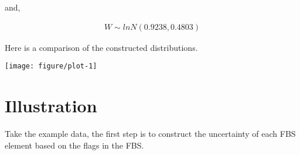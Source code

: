 \documentclass[nojss]{jss}\usepackage[]{graphicx}\usepackage[]{color}
\makeatletter
\def\maxwidth{ %
  \ifdim\Gin@nat@width>\linewidth
    \linewidth
  \else
    \Gin@nat@width
  \fi
}
\newenvironment{knitrout}{}{} %
\makeatother
\begin{document}
and,


\begin{align}
  W \sim lnN(0.9238, 
  0.4803)\nonumber
\end{align}


Here is a comparison of the constructed distributions.

\begin{knitrout}
\color{fgcolor}

{\centering \texttt{[image: figure/plot-1]} 

}



\end{knitrout}

  
  


\section{Illustration}


Take the example data, the first step is to construct the uncertainty
of each FBS element based on the flags in the FBS.
\end{document}
